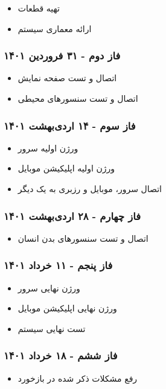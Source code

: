 \documentclass[12pt]{article}
\begin{document}
	\begin{itemize}
		\item تهیه قطعات
		\item  ارائه معماری سیستم
	\end{itemize}
	
	\subsubsection{فاز دوم - ۳۱ فروردین ۱۴۰۱}
	
	\begin{itemize}
		\item  اتصال و تست صفحه نمایش
		\item  اتصال و تست سنسورهای محیطی
	\end{itemize}
	
	\subsubsection{فاز سوم - ۱۴ اردی‌بهشت ۱۴۰۱}
	
	\begin{itemize}
		\item ورژن اولیه سرور
		\item ورژن اولیه اپلیکیشن موبایل
		\item  اتصال سرور، موبایل و رزبری به یک دیگر
	\end{itemize}
	
	\subsubsection{فاز چهارم - ۲۸ اردی‌بهشت ۱۴۰۱}
	
		
	\begin{itemize}
		\item اتصال و تست سنسورهای بدن انسان 
	\end{itemize}

	\subsubsection{فاز پنجم - ۱۱ خرداد ۱۴۰۱}
	
		
	\begin{itemize}
		\item ورژن نهایی سرور
		\item ورژن نهایی اپلیکیشن موبایل
		\item  تست نهایی سیستم
	\end{itemize}
	
	\subsubsection{فاز ششم - ۱۸ خرداد ۱۴۰۱}
	
			
	\begin{itemize}
		\item رفع مشکلات ذکر شده در بازخورد 
	\end{itemize}
\end{document}
